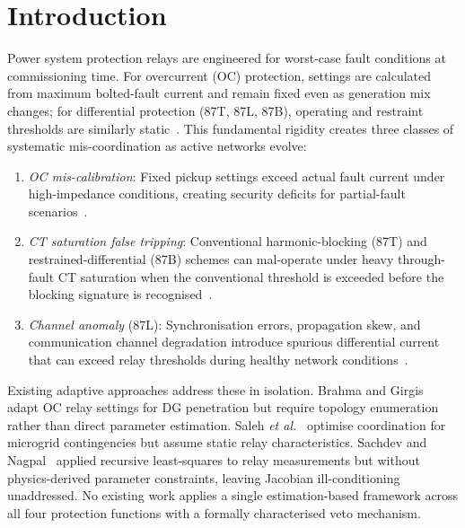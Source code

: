 \documentclass[journal,twoside,10pt]{IEEEtran}
\begin{document}
\section{Introduction}
\label{sec:intro}

Power system protection relays are engineered for worst-case fault
conditions at commissioning time.
For overcurrent (OC) protection, settings are calculated from maximum
bolted-fault current and remain fixed even as generation mix changes;
for differential protection (87T, 87L, 87B), operating and restraint
thresholds are similarly static~\cite{Blackburn2006,Anderson1999}.
This fundamental rigidity creates three classes of systematic mis-coordination
as active networks evolve:

\begin{enumerate}
  \item \textit{OC mis-calibration}: Fixed pickup settings exceed actual
        fault current under high-impedance conditions, creating security
        deficits for partial-fault scenarios~\cite{Brahma2004}.
  \item \textit{CT saturation false tripping}: Conventional harmonic-blocking
        (87T) and restrained-differential (87B) schemes can mal-operate
        under heavy through-fault CT saturation when the conventional
        threshold is exceeded before the blocking signature is
        recognised~\cite{Kasztenny2003,Schweitzer2009}.
  \item \textit{Channel anomaly} (87L): Synchronisation errors, propagation
        skew, and communication channel degradation introduce spurious
        differential current that can exceed relay thresholds during
        healthy network conditions~\cite{Adamiak2006}.
\end{enumerate}

Existing adaptive approaches address these in isolation.
Brahma and Girgis~\cite{Brahma2004} adapt OC relay settings for DG
penetration but require topology enumeration rather than direct
parameter estimation.
Saleh \textit{et al.}~\cite{Saleh2017} optimise coordination for
microgrid contingencies but assume static relay characteristics.
Sachdev and Nagpal~\cite{Sachdev1988} applied recursive least-squares
to relay measurements but without physics-derived parameter constraints,
leaving Jacobian ill-conditioning unaddressed.
No existing work applies a single estimation-based framework across all
four protection functions with a formally characterised veto mechanism.
\end{document}
